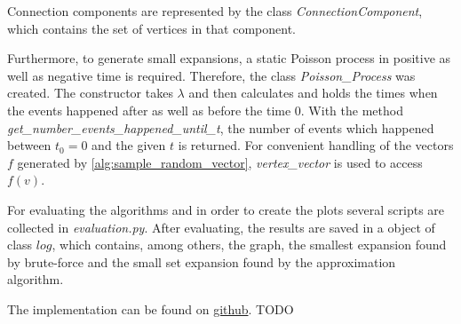 Connection components are represented by the class \textit{ConnectionComponent}, which contains the set of vertices in that component. 

Furthermore, to generate small expansions, a static Poisson process in positive as well as negative time is required. Therefore, the class \textit{Poisson\_Process} was created. The constructor takes $\lambda$ and then calculates and holds the times when the events happened after as well as before the time 0. With the method \textit{get\_number\_events\_happened\_until\_t}, the number of events which happened between $t_0=0$ and the given $t$ is returned. 
For convenient handling of the vectors $f$ generated by \cref{alg:sample_random_vector}, \textit{vertex\_vector} is used to access $f(v)$.

For evaluating the algorithms and in order to create the plots several scripts are collected in \textit{evaluation.py}.
After evaluating, the results are saved in a object of class $log$, which contains, among others, the graph, the smallest expansion found by brute-force and the small set expansion found by the approximation algorithm.

The implementation can be found on \href{github.com}{github}. TODO %
